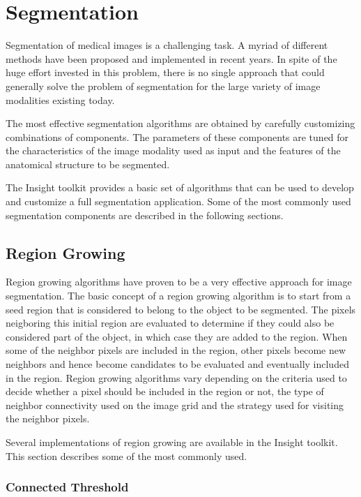 
\chapter{Segmentation}

Segmentation of medical images is a challenging task. A myriad of
different methods have been proposed and implemented in recent
years. In spite of the huge effort invested in this problem, there is
no single approach that could generally solve the problem of
segmentation for the large variety of image modalities existing today.

The most effective segmentation algorithms are obtained by carefully
customizing combinations of components. The parameters of these components are
tuned for the characteristics of the image modality used as input and the
features of the anatomical structure to be segmented. 

The Insight toolkit provides a basic set of algorithms that can be used to
develop and customize a full segmentation application. Some of the most
commonly used segmentation components are described in the following sections.


\section{Region Growing}

Region growing algorithms have proven to be a very effective approach for image
segmentation. The basic concept of a region growing algorithm is to start from
a seed region that is considered to belong to the object to be segmented. The
pixels neigboring this initial region are evaluated to determine if they could
also be considered part of the object, in which case they are added to the
region. When some of the neighbor pixels are included in the region, other
pixels become new neighbors and hence become candidates to be evaluated and
eventually included in the region. Region growing algorithms vary depending on
the criteria used to decide whether a pixel should be included in the region
or not, the type of neighbor connectivity used on the image grid and the
strategy used for visiting the neighbor pixels.

Several implementations of region growing are available in the
Insight toolkit. This section describes some of the most commonly used.

\subsection{Connected Threshold}

